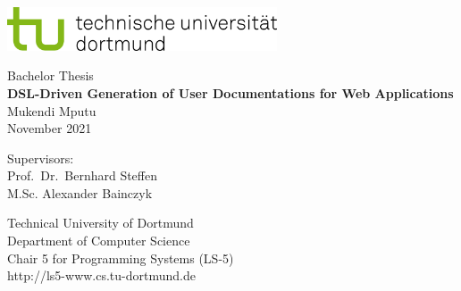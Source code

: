 \begin{titlepage}
\vspace*{-2cm}
\newlength{\links}
\setlength{\links}{-1.5cm}
\sffamily
\hspace*{\links}
\begin{minipage}{12.5cm}
\includegraphics[width=8cm]{bilder/tud_logo_rgb}
\end{minipage}

\vspace*{4cm}

\hspace*{\links}
\hspace*{-0.2cm}
\begin{minipage}{9cm}
\large
\begin{center}
{\Large Bachelor Thesis}\\
\vspace*{1cm}
\textbf{DSL-Driven Generation of User Documentations for Web Applications} \\
\vspace*{1cm}
Mukendi Mputu\\
November 2021
\end{center}
\end{minipage}
\normalsize
\vspace*{5.5cm}


\vspace*{2.1cm}

\hspace*{\links}
\begin{minipage}[b]{5cm}
\raggedright{}
Supervisors:\\
Prof.\ Dr.\ Bernhard Steffen\\
M.Sc. Alexander Bainczyk\\
\end{minipage}

\vspace*{2.5cm}
\hspace*{\links}
\begin{minipage}[b]{8cm}
\raggedright{}
Technical University of Dortmund \\
Department of Computer Science\\
Chair 5 for Programming Systems (LS-5)\\
http://ls5-www.cs.tu-dortmund.de
\end{minipage}

\end{titlepage}
